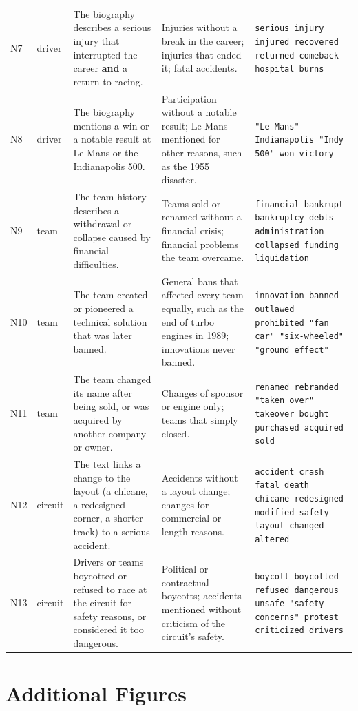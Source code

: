 \documentclass[sigconf]{acmart}
\begin{document}
{\begin{longtable}{p{0.6cm}p{1.2cm}p{5.6cm}p{5.2cm}p{4.2cm}}
  N7 & driver & The biography describes a serious injury that interrupted the
  career \textbf{and} a return to racing. & Injuries without a break in the
  career; injuries that ended it; fatal accidents. & \texttt{serious injury
  injured recovered returned comeback hospital burns} \\
  N8 & driver & The biography mentions a win or a notable result at Le Mans
  or the Indianapolis 500. & Participation without a notable result; Le Mans
  mentioned for other reasons, such as the 1955 disaster. & \texttt{"Le Mans"
  Indianapolis "Indy 500" won victory} \\
  N9 & team & The team history describes a withdrawal or collapse caused by
  financial difficulties. & Teams sold or renamed without a financial crisis;
  financial problems the team overcame. & \texttt{financial bankrupt
  bankruptcy debts administration collapsed funding liquidation} \\
  N10 & team & The team created or pioneered a technical solution that was
  later banned. & General bans that affected every team equally, such as the
  end of turbo engines in 1989; innovations never banned. &
  \texttt{innovation banned outlawed prohibited "fan car" "six-wheeled"
  "ground effect"} \\
  N11 & team & The team changed its name after being sold, or was acquired by
  another company or owner. & Changes of sponsor or engine only; teams that
  simply closed. & \texttt{renamed rebranded "taken over" takeover bought
  purchased acquired sold} \\
  N12 & circuit & The text links a change to the layout (a chicane, a
  redesigned corner, a shorter track) to a serious accident. & Accidents
  without a layout change; changes for commercial or length reasons. &
  \texttt{accident crash fatal death chicane redesigned modified safety
  layout changed altered} \\
  N13 & circuit & Drivers or teams boycotted or refused to race at the circuit
  for safety reasons, or considered it too dangerous. & Political or
  contractual boycotts; accidents mentioned without criticism of the
  circuit's safety. & \texttt{boycott boycotted refused dangerous unsafe
  "safety concerns" protest criticized drivers} \\
  \bottomrule
\end{longtable}
}

\section{Additional Figures}
\end{document}
